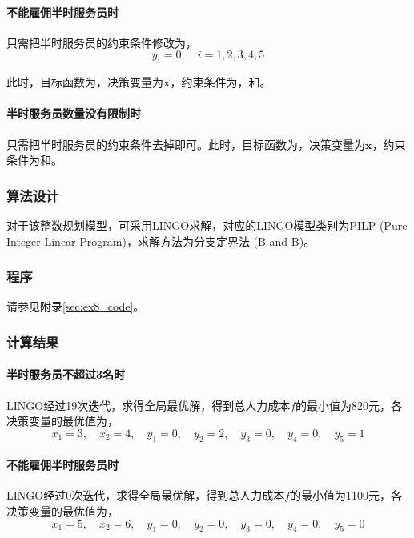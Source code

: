 \paragraph{不能雇佣半时服务员时} 只需把半时服务员的约束条件修改为，
\begin{equation}\label{eq:ex8_cons_no_parttime}
    y_i = 0, \quad i=1,2,3,4,5
\end{equation}

此时，目标函数为，决策变量为$\mathbf{x}$，约束条件为，和。

\paragraph{半时服务员数量没有限制时} 只需把半时服务员的约束条件去掉即可。此时，目标函数为，决策变量为$\mathbf{x}$，约束条件为和。

\subsubsection{算法设计}

对于该整数规划模型，可采用LINGO求解，对应的LINGO模型类别为PILP (Pure Integer Linear Program)，求解方法为分支定界法 (B-and-B)。

\subsubsection{程序}

请参见附录\ref{sec:ex8_code}。

\subsubsection{计算结果}

\paragraph{半时服务员不超过3名时} LINGO经过19次迭代，求得全局最优解，得到总人力成本$f$的最小值为820元，各决策变量的最优值为，
\begin{equation}
    x_1 = 3, \quad x_2 = 4, \quad y_1 = 0, \quad y_2 = 2, \quad y_3 = 0, \quad y_4 = 0, \quad y_5 = 1
\end{equation}

\paragraph{不能雇佣半时服务员时} LINGO经过0次迭代，求得全局最优解，得到总人力成本$f$的最小值为1100元，各决策变量的最优值为，
\begin{equation}
    x_1 = 5, \quad x_2 = 6, \quad y_1 = 0, \quad y_2 = 0, \quad y_3 = 0, \quad y_4 = 0, \quad y_5 = 0
\end{equation}

